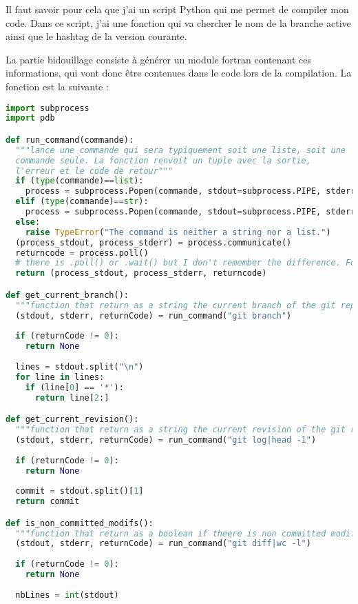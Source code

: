 Il faut savoir pour cela que j'ai un script Python qui me permet de compiler mon code. Dans ce script, j'ai une fonction qui va chercher le nom de la branche active ainsi que le hashtag de la version courante. 

La partie bidouillage consiste à générer un module fortran contenant ces informations, qui vont donc être contenues dans le code lors de la compilation. La fonction est la suivante :
\begin{lstlisting}[language=python]
import subprocess
import pdb

def run_command(commande):
  """lance une commande qui sera typiquement soit une liste, soit une 
  commande seule. La fonction renvoit un tuple avec la sortie, 
  l'erreur et le code de retour"""
  if (type(commande)==list):
    process = subprocess.Popen(commande, stdout=subprocess.PIPE, stderr=subprocess.PIPE)
  elif (type(commande)==str):
    process = subprocess.Popen(commande, stdout=subprocess.PIPE, stderr=subprocess.PIPE, shell=True)
  else:
    raise TypeError("The command is neither a string nor a list.")
  (process_stdout, process_stderr) = process.communicate()
  returncode = process.poll()
  # there is .poll() or .wait() but I don't remember the difference. For some kind of things, one of the two was not working
  return (process_stdout, process_stderr, returncode)

def get_current_branch():
  """function that return as a string the current branch of the git repository"""
  (stdout, stderr, returnCode) = run_command("git branch")
  
  if (returnCode != 0):
    return None
  
  lines = stdout.split("\n")
  for line in lines:
    if (line[0] == '*'):
      return line[2:]

def get_current_revision():
  """function that return as a string the current revision of the git repository"""
  (stdout, stderr, returnCode) = run_command("git log|head -1")
  
  if (returnCode != 0):
    return None
  
  commit = stdout.split()[1]
  return commit

def is_non_committed_modifs():
  """function that return as a boolean if theere is non committed modifications in the repository"""
  (stdout, stderr, returnCode) = run_command("git diff|wc -l")
  
  if (returnCode != 0):
    return None
  
  nbLines = int(stdout)
  

\end{lstlisting}
